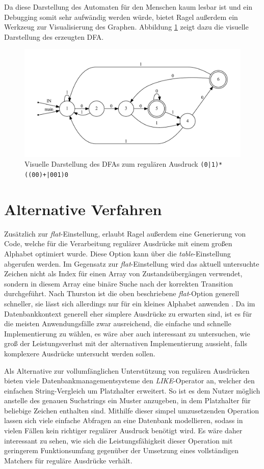 Da diese Darstellung des Automaten für den Menschen kaum lesbar ist und ein Debugging somit sehr aufwändig werden würde, bietet Ragel außerdem ein Werkzeug zur Visualisierung des Graphen.
Abbildung \ref{ragel_visualisierung} zeigt dazu die visuelle Darstellung des erzeugten DFA.

\begin{figure}[ht]
	\includegraphics[width=\textwidth]{bilder/ragel_visualisierung.pdf}
	\caption{Visuelle Darstellung des DFAs zum regulären Ausdruck \texttt{(0|1)*((00)+|001)0}}
	\label{ragel_visualisierung}
\end{figure}

\section{Alternative Verfahren}
\label{sec:regex_alternativen}

Zusätzlich zur \emph{flat}-Einstellung, erlaubt Ragel außerdem eine Generierung von Code, welche für die Verarbeitung regulärer Ausdrücke mit einem großen Alphabet optimiert wurde.
Diese Option kann über die \emph{table}-Einstellung abgerufen werden.
Im Gegensatz zur \emph{flat}-Einstellung wird das aktuell untersuchte Zeichen nicht als Index für einen Array von Zustandsübergängen verwendet, sondern in diesem Array eine binäre Suche nach der korrekten Transition durchgeführt.
Nach Thurston ist die oben beschriebene \emph{flat}-Option generell schneller, sie lässt sich allerdings nur für ein kleines Alphabet anwenden \cite{Thurston2009}.
Da im Datenbankkontext generell eher simplere Ausdrücke zu erwarten sind, ist es für die meisten Anwendungsfälle zwar ausreichend, die einfache und schnelle Implementierung zu wählen, es wäre aber auch interessant zu untersuchen, wie groß der Leistungsverlust mit der alternativen Implementierung aussieht, falls komplexere Ausdrücke untersucht werden sollen.

Als Alternative zur vollumfänglichen Unterstützung von regulären Ausdrücken bieten viele Datenbankmanagementsysteme den \emph{LIKE}-Operator an, welcher den einfachen String-Vergleich um Platzhalter erweitert.
So ist es dem Nutzer möglich anstelle des genauen Suchstrings ein Muster anzugeben, in dem Platzhalter für beliebige Zeichen enthalten sind.
Mithilfe dieser simpel umzusetzenden Operation lassen sich viele einfache Abfragen an eine Datenbank modellieren, sodass in vielen Fällen kein richtiger regulärer Ausdruck benötigt wird.
Es wäre daher interessant zu sehen, wie sich die Leistungsfähigkeit dieser Operation mit geringerem Funktionsumfang gegenüber der Umsetzung eines vollständigen Matchers für reguläre Ausdrücke verhält.